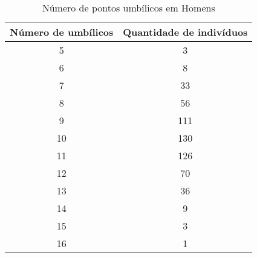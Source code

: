 \documentclass[a4paper,12pt]{article}
\begin{document}
\begin{table}[h!]
\centering
\caption{Número de pontos umbílicos em Homens}
\begin{tabular}{c c}
\hline
\textbf{Número de umbílicos} & \textbf{Quantidade de indivíduos} \\ 
\hline
5  & 3   \\
6  & 8   \\
7  & 33  \\
8  & 56  \\
9  & 111 \\
10 & 130 \\
11 & 126 \\
12 & 70  \\
13 & 36  \\
14 & 9   \\
15 & 3   \\
16 & 1   \\
\hline
\end{tabular}
\end{table}
\end{document}
